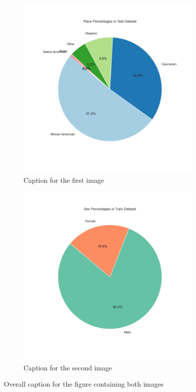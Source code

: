 \documentclass[conference]{IEEEtran}
\begin{document}
	
	\begin{figure}[!ht]
		\centering
		\begin{subfigure}[b]{0.45\textwidth}
			\centering
			\includegraphics[width=\textwidth]{img/race_percentages_pie.png}
			\caption{Caption for the first image}
			\label{fig:image1}
		\end{subfigure}
		\hfill
		\begin{subfigure}[b]{0.45\textwidth}
			\centering
			\includegraphics[width=\textwidth]{img/sex_percentages_pie.png}
			\caption{Caption for the second image}
			\label{fig:image2}
		\end{subfigure}
		\caption{Overall caption for the figure containing both images}
		\label{fig:race-sex-breakdown}
	\end{figure}
	
\end{document}

